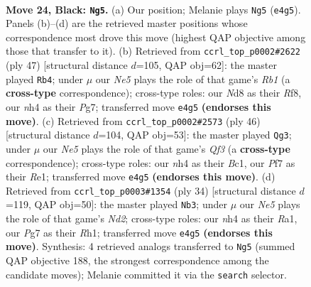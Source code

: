 \documentclass[11pt]{article}
\begin{document}
\clearpage

\begin{figure}[p]\centering
\begin{subfigure}{0.46\textwidth}\centering
\resizebox{\linewidth}{!}{%
\newchessgame
\chessboard[
  setfen={r1bn1k2/1ppp1ppp/p2q4/B2Pr3/Q3n2N/4P1PB/PP2RP1P/1R4K1 b - - 24 24},
  showmover=false,
  pgfstyle=straightmove, color=movearrow, markmove={e4-g5}
]}
\caption{}
\end{subfigure}\hfill
\begin{subfigure}{0.46\textwidth}\centering
\resizebox{\linewidth}{!}{%
\newchessgame
\chessboard[
  setfen={1r3rk1/2p2pp1/p1np1q1p/P5bn/2BPP3/4BP1Q/5P1P/RN1R3K b - - 0 24},
  showmover=false,
  pgfstyle=straightmove, color=movearrow, markmove={b8-b4}
]}
\caption{}
\end{subfigure}
\\[4pt]
\begin{subfigure}{0.46\textwidth}\centering
\resizebox{\linewidth}{!}{%
\newchessgame
\chessboard[
  setfen={rq1r2k1/5pp1/2bpp1np/p1b5/2P1P3/1PN2Q1P/R4PP1/2B1RBK1 w - - 9 24},
  showmover=false,
  pgfstyle=straightmove, color=movearrow, markmove={f3-g3}
]}
\caption{}
\end{subfigure}\hfill
\begin{subfigure}{0.46\textwidth}\centering
\resizebox{\linewidth}{!}{%
\newchessgame
\chessboard[
  setfen={r1n1qk1r/p1b2p2/P1p3p1/1p1p1p1p/1N1P3P/4PQP1/1PPN1P2/R3K2R w KQ - 2 18},
  showmover=false,
  pgfstyle=straightmove, color=movearrow, markmove={d2-b3}
]}
\caption{}
\end{subfigure}
\caption{\textbf{Move 24, Black: \texttt{Ng5}.} (a) Our position; Melanie plays \texttt{Ng5} (\texttt{e4g5}). Panels (b)--(d) are the retrieved master positions whose correspondence most drove this move (highest QAP objective among those that transfer to it). (b) Retrieved from \texttt{ccrl\_top\_p0002\#2622} (ply 47) [structural distance $d$=105, QAP obj=62]: the master played \texttt{Rb4}; under $\mu$ our \emph{Ne5} plays the role of that game's \emph{Rb1} (a \textbf{cross-type} correspondence); cross-type roles: our \emph{N}d8 as their \emph{R}f8, our \emph{n}h4 as their \emph{P}g7; transferred move \texttt{e4g5} \textbf{(endorses this move)}. (c) Retrieved from \texttt{ccrl\_top\_p0002\#2573} (ply 46) [structural distance $d$=104, QAP obj=53]: the master played \texttt{Qg3}; under $\mu$ our \emph{Ne5} plays the role of that game's \emph{Qf3} (a \textbf{cross-type} correspondence); cross-type roles: our \emph{n}h4 as their \emph{B}c1, our \emph{P}f7 as their \emph{R}e1; transferred move \texttt{e4g5} \textbf{(endorses this move)}. (d) Retrieved from \texttt{ccrl\_top\_p0003\#1354} (ply 34) [structural distance $d$=119, QAP obj=50]: the master played \texttt{Nb3}; under $\mu$ our \emph{Ne5} plays the role of that game's \emph{Nd2}; cross-type roles: our \emph{n}h4 as their \emph{R}a1, our \emph{P}g7 as their \emph{R}h1; transferred move \texttt{e4g5} \textbf{(endorses this move)}. Synthesis: 4 retrieved analogs transferred to \texttt{Ng5} (summed QAP objective 188, the strongest correspondence among the candidate moves); Melanie committed it via the \texttt{search} selector.}
\label{fig:thought-m47}
\end{figure}
\end{document}

